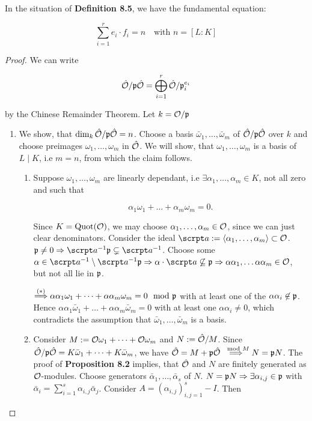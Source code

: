 \begin{Satz}
	In the situation of \textbf{Definition 8.5}, we have the fundamental equation:
	
	\[ \sum_{i=1}^r e_i \cdot f_i = n \quad \text{with } n = \left[ L:K\right]     \]
\end{Satz}
\begin{proof}
	We can write
	
	\[ \hat{\mathcal{O}} / \mathfrak{p}\hat{\mathcal{O}} = \bigoplus_{i=1}^r	\hat{\mathcal{O}} / \mathfrak{p}_i^{e_i}	\]
	
	by the Chinese Remainder Theorem. Let $k = \mathcal{O} / \mathfrak{p}$
	
	\begin{enumerate}[Step 1:]
		\item We show, that $\dim_k \hat{\mathcal{O}}/\mathfrak{p}\hat{\mathcal{O}} = n$. Choose a basis $\bar\omega_1, \dots, \bar\omega_m$ of $\hat{\mathcal{O}}/\mathfrak{p}\hat{\mathcal{O}}$ over $k$ and choose preimages $\omega_1, \dots, \omega_m$ in $\hat{\mathcal{O}}$. We will show, that $\omega_1, \dots, \omega_m$ is a basis of $L \mid K$, i.e $m = n$, from which the claim follows.
		
		\begin{enumerate}[(1)]
			\item Suppose $\omega_1, \dots, \omega_m$ are linearly dependant, i.e $\exists \alpha_1, \dots, \alpha_m \in K$, not all zero and such that
			 
			 \[  \alpha_1\omega_1 + \dots + \alpha_m\omega_m = 0. \tag{$\ast$}     \]
			 
			 Since $K = \operatorname{Quot}(\mathcal{O})$, we may choose $\alpha_1, \dots, \alpha_m \in \mathcal{O}$, since we can just clear denominators. Consider the ideal $\a := \left\langle \alpha_1, \dots, \alpha_m \right\rangle \subset \O$. $\p \neq 0 \Rightarrow \a^{-1}\p \subsetneq \a^{-1}$. Choose some $\alpha \in \a^{-1} \setminus \a^{-1}\p \Rightarrow \alpha \cdot \a \not\subseteq \p \Rightarrow \alpha\alpha_1, \dots \alpha\alpha_m \in \O$, but not all lie in $\mathfrak{p}$.
			 
			 $\overset{(\ast)}{\Longrightarrow} \alpha\alpha_1\omega_1 + \dots + \alpha\alpha_m\omega_m = 0 \mod {\mathfrak{p}}$ with at least one of the $\alpha\alpha_i \not\in \mathfrak{p}$. Hence $\alpha\alpha_1\bar\omega_1 + \dots + \alpha\alpha_m\bar\omega_m = 0$ with at least one $\alpha\alpha_i \neq 0$, which contradicts the assumption that $\bar\omega_1, \dots, \bar\omega_m$ is a basis.
			 
			 \item Consider $M := \mathcal{O}\omega_1 + \dots + \mathcal{O}\omega_m$ and $N:= \hat{\mathcal{O}}/M$. Since $\hat{\mathcal{O}}/\mathfrak{p}\hat{\mathcal{O}} = K\bar\omega_1 + \dots + K\bar\omega_m$, we have $\hat{\mathcal{O}} = M + \mathfrak{p}\hat{\mathcal{O}} \overset{\mod M}{\Longrightarrow} N = \mathfrak{p} N$. The proof of \textbf{Proposition 8.2} implies, that $\hat{\mathcal{O}}$ and $N$ are finitely generated as $\mathcal{O}$-modules. Choose generators $\bar\alpha_1, \dots, \bar\alpha_s$ of $N$. $N = \mathfrak{p} N \Rightarrow \exists \alpha_{i,j} \in \mathfrak{p}$ with $\bar\alpha_i = \sum_{i=1}^s \alpha_{i,j}\bar\alpha_j$. Consider $A = (\alpha_{i,j})_{i,j=1}^s - I$. Then
			 

\end{enumerate}
\end{enumerate}
\end{proof}
